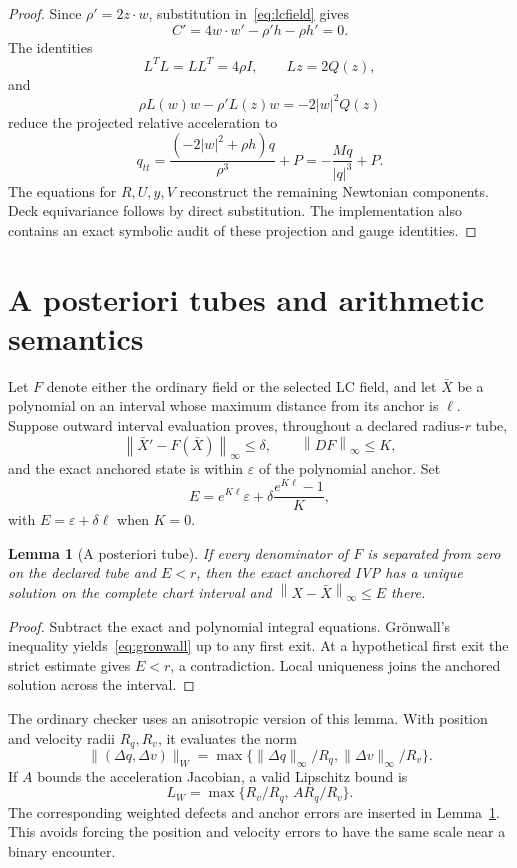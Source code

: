 \documentclass[11pt]{article}
\newtheorem{lemma}[theorem]{Lemma}
\newcommand{\norm}[1]{\left\lVert#1\right\rVert}
\begin{document}
\begin{proof}
Since $\rho'=2z\cdot w$, substitution in~\eqref{eq:lcfield} gives
\[
 C'=4w\cdot w'-\rho'h-\rho h'=0.
\]
The identities
\[
 L^TL=LL^T=4\rho I,\qquad Lz=2Q(z),
\]
and
\[
 \rho L(w)w-\rho' L(z)w=-2|w|^2Q(z)
\]
reduce the projected relative acceleration to
\[
 q_{tt}=\frac{(-2|w|^2+\rho h)q}{\rho^3}+P
       =-\frac{Mq}{|q|^3}+P.
\]
The equations for $R,U,y,V$ reconstruct the remaining Newtonian components.
Deck equivariance follows by direct substitution.  The implementation also
contains an exact symbolic audit of these projection and gauge identities.
\end{proof}

\section{A posteriori tubes and arithmetic semantics}
\label{sec:tubes}

Let $F$ denote either the ordinary field or the selected LC field, and let
$\bar X$ be a polynomial on an interval whose maximum distance from its
anchor is $\ell$.  Suppose outward interval evaluation proves, throughout a
declared radius-$r$ tube,
\[
 \norm{\bar X'-F(\bar X)}_\infty\leq\delta,
 \qquad \norm{DF}_\infty\leq K,
\]
and the exact anchored state is within $\varepsilon$ of the polynomial
anchor.  Set
\begin{equation}
 E=e^{K\ell}\varepsilon+
   \delta\frac{e^{K\ell}-1}{K},
 \label{eq:gronwall}
\end{equation}
with $E=\varepsilon+\delta\ell$ when $K=0$.

\begin{lemma}[A posteriori tube]
\label{lem:tube}
If every denominator of $F$ is separated from zero on the declared tube and
$E<r$, then the exact anchored IVP has a unique solution on the complete
chart interval and $\norm{X-\bar X}_\infty\le E$ there.
\end{lemma}

\begin{proof}
Subtract the exact and polynomial integral equations.  Gr\"onwall's
inequality yields~\eqref{eq:gronwall} up to any first exit.  At a hypothetical
first exit the strict estimate gives $E<r$, a contradiction.  Local
uniqueness joins the anchored solution across the interval.
\end{proof}

The ordinary checker uses an anisotropic version of this lemma.  With
position and velocity radii $R_q,R_v$, it evaluates the norm
\[
 \|(\Delta q,\Delta v)\|_W=
 \max\{\|\Delta q\|_\infty/R_q,
       \|\Delta v\|_\infty/R_v\}.
\]
If $A$ bounds the acceleration Jacobian, a valid Lipschitz bound is
\[
 L_W=\max\{R_v/R_q,\,A R_q/R_v\}.
\]
The corresponding weighted defects and anchor errors are inserted in
Lemma~\ref{lem:tube}.  This avoids forcing the position and velocity errors
to have the same scale near a binary encounter.
\end{document}
